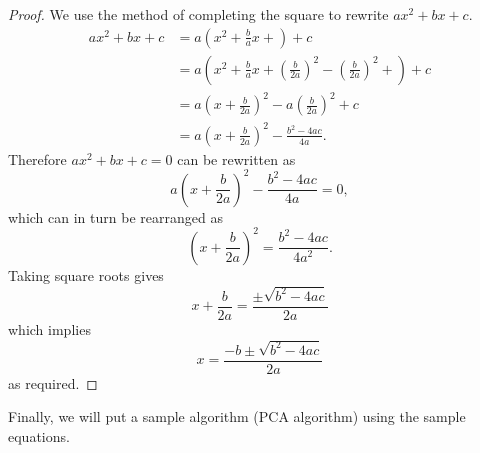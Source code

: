 \documentclass[a4paper,onesided,12pt]{report}
\begin{document}
\begin{proof}
We use the method of completing the square to rewrite $ax^2+bx+c$.
\begin{align*}
ax^2+bx+c&=a\left( x^2 + \frac{b}{a}x+\right)+c \\
  &=a\left( x^2 + \frac{b}{a}x+ \left(\frac{b}{2a}\right)^2
     -\left(\frac{b}{2a}\right)^2 +\right)+c \\
  &=a\left( x+\frac{b}{2a}\right)^2 - 
a\left(\frac{b}{2a}\right)^2+c\\
  &= a\left( x+\frac{b}{2a}\right)^2- \frac{b^2-4ac}{4a}.
\end{align*}
Therefore $ax^2+bx+c=0$ can be rewritten as 
$$
a\left( x+\frac{b}{2a}\right)^2- \frac{b^2-4ac}{4a}=0,
$$
which can in turn  be rearranged as
$$
\left( x+\frac{b}{2a}\right)^2= \frac{b^2-4ac}{4a^2}.
$$
Taking square roots gives
$$
x+\frac{b}{2a}= \frac{\pm \sqrt{b^2-4ac}}{2a}
$$
which implies
$$
x=\frac{-b\pm \sqrt{b^2-4ac}}{2a}
$$
as required.
\end{proof}
Finally, we will put a sample algorithm (PCA algorithm) using the
sample equations.

 
\end{document}
